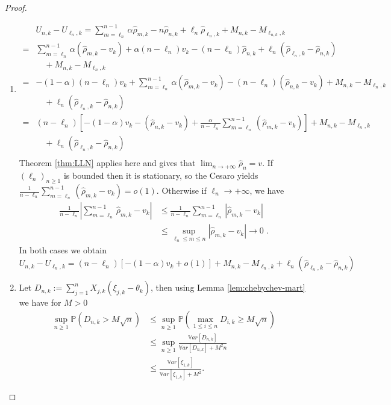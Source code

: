 \begin{proof}
	\begin{enumerate}[label=(\roman*)]
		\item \begin{align*}
			&U_{n,k} - U_{\ell_{n},k} = \sum_{m=\ell_{n}}^{n-1} \alpha \hat{\rho}_{m,k} - n \hat{\rho}_{n,k} + \ell_{n} \hat{\rho}_{\ell_{n},k} + M_{n,k} - M_{\ell_{n,k},k} \\
			=& \sum_{m=\ell_{n}}^{n-1} \alpha (\hat{\rho}_{m,k} - v_k) + \alpha(n - \ell_{n}) v_k - (n - \ell_{n}) \hat{\rho}_{n,k} + \ell_{n} (\hat{\rho}_{\ell_{n},k} - \hat{\rho}_{n,k}) \\ 
			&\quad + M_{n,k} - M_{\ell_{n},k} \\
			=& -(1 - \alpha)(n - \ell_{n}) v_k + \sum_{m=\ell_{n}}^{n-1} \alpha (\hat{\rho}_{m,k} - v_k) - (n - \ell_{n})(\hat{\rho}_{n,k} - v_k) + M_{n,k} - M_{\ell_{n},k} \\
			&\quad + \ell_{n} (\hat{\rho}_{\ell_{n},k} - \hat{\rho}_{n,k}) \\ 
			=& (n-\ell_{n})\left[-(1 - \alpha)v_k - (\hat{\rho}_{n,k} - v_k) + \frac{\alpha}{n - \ell_{n}}\sum_{m=\ell_{n}}^{n-1} (\hat{\rho}_{m,k} - v_k)\right]+ M_{n,k} - M_{\ell_{n},k} \\
			&\quad + \ell_{n} (\hat{\rho}_{\ell_{n},k} - \hat{\rho}_{n,k}) \\
		\end{align*}
		Theorem \ref{thm:LLN} applies here and gives that \(\lim_{n \to +\infty} \hat{\rho}_n = v\). If \(\left(\ell_{n}\right)_{n \geq 1}\) is bounded then it is stationary, so the Cesaro yields \(\frac{1}{n - \ell_{n}}\sum_{m=\ell_{n}}^{n-1} (\hat{\rho}_{m,k} - v_k) = o(1)\). Otherwise if \(\ell_{n} \to +\infty\), we have
		\begin{align*}
			\frac{1}{n - \ell_{n}}\left|\sum_{m=\ell_{n}}^{n-1} \hat{\rho}_{m,k} - v_k\right| &\leq \frac{1}{n - \ell_{n}}\sum_{m=\ell_{n}}^{n-1} |\hat{\rho}_{m,k} - v_k| \\
			&\leq \sup_{\ell_{n} \leq m \leq n}|\hat{\rho}_{m,k} - v_k| \to 0\;.
		\end{align*}		
		In both cases we obtain
		\begin{equation*}
			U_{n,k} - U_{\ell_{n},k} = (n - \ell_{n})[-(1 - \alpha)v_k + o(1)] + M_{n,k} - M_{\ell_{n},k} + \ell_{n} (\hat{\rho}_{\ell_{n},k} - \hat{\rho}_{n,k})
		\end{equation*}
		\item 
		Let \( D_{n,k} := \sum_{j=1}^{n} X_{j,k}(\xi_{j,k}-\theta_k) \), then using Lemma \ref{lem:chebychev-mart} we have for \( M>0 \)		
		\begin{align*}
			\sup_{n\geq 1} \mathbb{P}(D_{n,k} > M\sqrt{n})
			&\leq \sup_{n\geq 1}
			\mathbb{P}\!\left(\max_{1\leq i\leq n} D_{i,k} \geq M\sqrt{n}\right) \\
			&\leq \sup_{n\geq 1}
			\frac{\mathbb{V}ar\left[D_{n,k}\right]}
			{\mathbb{V}ar\left[D_{n,k}\right] + M^2 n} \\
			&\leq
			\frac{\mathbb{V}ar[\xi_{1,k}]}
			{\mathbb{V}ar[\xi_{1,k}] + M^2}.
		\end{align*}
		

\end{enumerate}
\end{proof}
